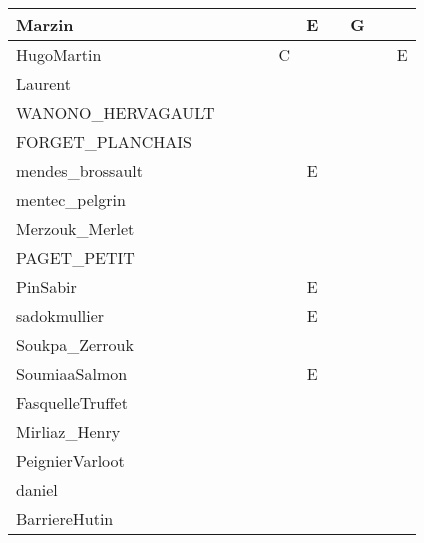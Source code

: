 \documentclass[a4paper]{article}
\begin{document}
\begin{table}[h!]
\begin{tabular}{|l|c|c|c|c|c|c|c|c|c|}
    Marzin                  &       &       &       &       & E     &       & G     &       &       \\ \hline
    HugoMartin              &       &       &       & C     &       &       &       &       & E     \\ \hline
    Laurent                 &       &       &       &       &       &       &       &       &       \\ \hline
    WANONO\_HERVAGAULT      &       &       &       &       &       &       &       &       &       \\ \hline
    FORGET\_PLANCHAIS       &       &       &       &       &       &       &       &       &       \\ \hline
    mendes\_brossault       &       &       &       &       & E     &       &       &       &       \\ \hline
    mentec\_pelgrin         &       &       &       &       &       &       &       &       &       \\ \hline
    Merzouk\_Merlet         &       &       &       &       &       &       &       &       &       \\ \hline
    PAGET\_PETIT            &       &       &       &       &       &       &       &       &       \\ \hline
    PinSabir                &       &       &       &       & E     &       &       &       &       \\ \hline
    sadokmullier            &       &       &       &       & E     &       &       &       &       \\ \hline
    Soukpa\_Zerrouk         &       &       &       &       &       &       &       &       &       \\ \hline
    SoumiaaSalmon           &       &       &       &       & E     &       &       &       &       \\ \hline
    FasquelleTruffet        &       &       &       &       &       &       &       &       &       \\ \hline
    Mirliaz\_Henry          &       &       &       &       &       &       &       &       &       \\ \hline
    PeignierVarloot         &       &       &       &       &       &       &       &       &       \\ \hline
    daniel                  &       &       &       &       &       &       &       &       &       \\ \hline
    BarriereHutin           &       &       &       &       &       &       &       &       &       \\ \hline

\end{tabular}
\end{table}
\end{document}
